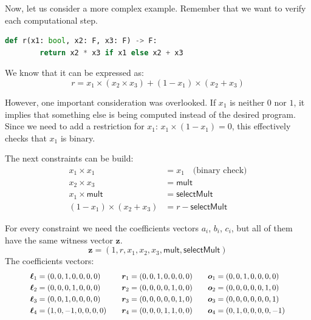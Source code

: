 \documentclass[../lecture-notes-148x210.tex]{subfiles}
\begin{document}
\begin{example}
    Now, let us consider a more complex example. Remember that we want to verify each computational step.

    \begin{lstlisting}[language=Python,numbers=none]
    def r(x1: bool, x2: F, x3: F) -> F:
        return x2 * x3 if x1 else x2 + x3
    \end{lstlisting}

    We know that it can be expressed as:
    \[ r = x_1 \times (x_2 \times x_3) + (1 - x_1) \times (x_2 + x_3) \]

    However, one important consideration was overlooked. If $x_1$ is neither $0$ nor $1$, it implies
    that something else is being computed instead of the desired program. Since we need to add a
    restriction for $x_1$: $x_1 \times (1 - x_1) = 0$, this effectively checks that $x_1$ is binary.

    The next constraints can be build:
    \begin{align*}
        x_1 \times x_1 &= x_1 \quad \text{(binary check)} \tag{1} \\
        x_2 \times x_3 &= \mathsf{mult} \tag{2} \\
        x_1 \times \mathsf{mult} &= \mathsf{selectMult} \tag{3} \\
        (1 - x_1) \times (x_2 + x_3) &= r - \mathsf{selectMult} \tag{4}
    \end{align*}

    For every constraint we need the coefficients vectors $a_i$, $b_i$, $c_i$, but all of them have
    the same witness vector $\mathbf{z}$.
    \[ \mathbf{z} = (1, r, x_1, x_2, x_3, \mathsf{mult}, \mathsf{selectMult}) \]
    The coefficients vectors:
    \begin{equation*}            
    \scalebox{0.9}{$
        \begin{aligned}
            \boldsymbol{\ell}_1 &= (0, 0, 1, 0, 0, 0, 0) & \quad \boldsymbol{r}_1 &= (0, 0, 1, 0, 0, 0, 0) & \quad \boldsymbol{o}_1 &= (0, 0, 1, 0, 0, 0, 0) \\
            \boldsymbol{\ell}_2 &= (0, 0, 0, 1, 0, 0, 0) & \quad \boldsymbol{r}_2 &= (0, 0, 0, 0, 1, 0, 0) & \quad \boldsymbol{o}_2 &= (0, 0, 0, 0, 0, 1, 0) \\
            \boldsymbol{\ell}_3 &= (0, 0, 1, 0, 0, 0, 0) & \quad \boldsymbol{r}_3 &= (0, 0, 0, 0, 0, 1, 0) & \quad \boldsymbol{o}_3 &= (0, 0, 0, 0, 0, 0, 1) \\
            \boldsymbol{\ell}_4 &= (1, 0, -1, 0, 0, 0, 0) & \quad \boldsymbol{r}_4 &= (0, 0, 0, 1, 1, 0, 0) & \quad \boldsymbol{o}_4 &= (0, 1, 0, 0, 0, 0, -1)
        \end{aligned}
    $}
    \end{equation*}


\end{example}
\end{document}

